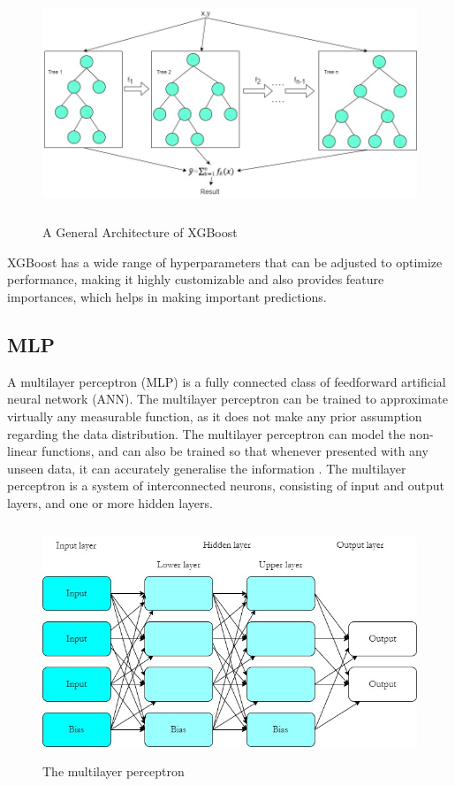 \begin{figure}[H]
\centering
\includegraphics[width=150mm,height=70mm]{figures/xgb.jpg}
\caption{A General Architecture of XGBoost}
\label{DLAccuracy}
\end{figure}

XGBoost has a wide range of hyperparameters that can be adjusted to optimize performance, making it highly customizable and also provides feature importances, which helps in making important predictions.

\subsection{MLP}
A multilayer perceptron (MLP) is a fully connected class of feedforward artificial neural network (ANN). The multilayer perceptron can be trained to approximate virtually any measurable function, as it does not make any prior assumption regarding the data distribution. The multilayer perceptron can model the non-linear functions, and can also be trained so that whenever presented with any unseen data, it can accurately generalise the information \cite{ar28}. The multilayer perceptron is a system of interconnected neurons, consisting of input and output layers, and one or more hidden layers.

\begin{figure}[H]
\centering
\includegraphics[width=125mm,height=70mm]{figures/mlp.jpg}
\caption{The multilayer perceptron}
\label{DLAccuracy}
\end{figure}

